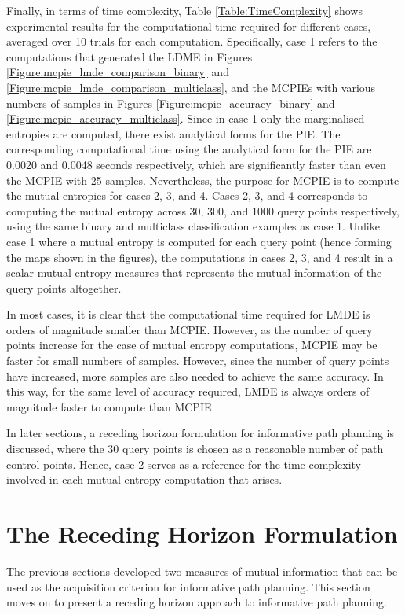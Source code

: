 		Finally, in terms of time complexity, Table \ref{Table:TimeComplexity} shows experimental results for the computational time required for different cases, averaged over 10 trials for each computation. Specifically, case 1 refers to the computations that generated the LDME in Figures \ref{Figure:mcpie_lmde_comparison_binary} and \ref{Figure:mcpie_lmde_comparison_multiclass}, and the MCPIEs with various numbers of samples in Figures \ref{Figure:mcpie_accuracy_binary} and \ref{Figure:mcpie_accuracy_multiclass}. Since in case 1 only the marginalised entropies are computed, there exist analytical forms for the PIE. The corresponding computational time using the analytical form for the PIE are 0.0020 and 0.0048 seconds respectively, which are significantly faster than even the MCPIE with 25 samples. Nevertheless, the purpose for MCPIE is to compute the mutual entropies for cases 2, 3, and 4. Cases 2, 3, and 4 corresponds to computing the mutual entropy across 30, 300, and 1000 query points respectively, using the same binary and multiclass classification examples as case 1. Unlike case 1 where a mutual entropy is computed for each query point (hence forming the maps shown in the figures), the computations in cases 2, 3, and 4 result in a scalar mutual entropy measures that represents the mutual information of the query points altogether.
		
		In most cases, it is clear that the computational time required for LMDE is orders of magnitude smaller than MCPIE. However, as the number of query points increase for the case of mutual entropy computations, MCPIE may be faster for small numbers of samples. However, since the number of query points have increased, more samples are also needed to achieve the same accuracy. In this way, for the same level of accuracy required, LMDE is always orders of magnitude faster to compute than MCPIE.
		
		In later sections, a receding horizon formulation for informative path planning is discussed, where the 30 query points is chosen as a reasonable number of path control points. Hence, case 2 serves as a reference for the time complexity involved in each mutual entropy computation that arises.

	\section{The Receding Horizon Formulation}
	\label{InformativeSeafloorExploration:RecedingHorizonFormulation}
	
		The previous sections developed two measures of mutual information that can be used as the acquisition criterion for informative path planning. This section moves on to present a receding horizon approach to informative path planning.
		
